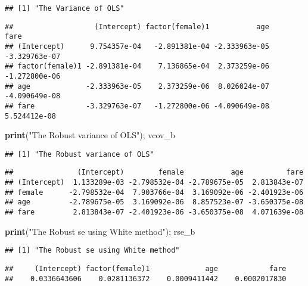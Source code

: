 \documentclass[
  12pt,
]{article}
\newenvironment{Shaded}{\begin{snugshade}}{\end{snugshade}}
\newcommand{\KeywordTok}[1]{\textcolor[rgb]{0.13,0.29,0.53}{\textbf{#1}}}
\newcommand{\NormalTok}[1]{#1}
\newcommand{\StringTok}[1]{\textcolor[rgb]{0.31,0.60,0.02}{#1}}
\begin{document}
\begin{verbatim}
## [1] "The Variance of OLS"
\end{verbatim}

\begin{verbatim}
##                   (Intercept) factor(female)1           age          fare
## (Intercept)      9.754357e-04   -2.891381e-04 -2.333963e-05 -3.329763e-07
## factor(female)1 -2.891381e-04    7.136865e-04  2.373259e-06 -1.272800e-06
## age             -2.333963e-05    2.373259e-06  8.026024e-07 -4.090649e-08
## fare            -3.329763e-07   -1.272800e-06 -4.090649e-08  5.524412e-08
\end{verbatim}

\begin{Shaded}
\begin{Highlighting}[]
\KeywordTok{print}\NormalTok{(}\StringTok{"The Robust variance of OLS"}\NormalTok{); vcov\_b}
\end{Highlighting}
\end{Shaded}

\begin{verbatim}
## [1] "The Robust variance of OLS"
\end{verbatim}

\begin{verbatim}
##               (Intercept)        female           age          fare
## (Intercept)  1.133289e-03 -2.798532e-04 -2.789675e-05  2.813843e-07
## female      -2.798532e-04  7.903766e-04  3.169092e-06 -2.401923e-06
## age         -2.789675e-05  3.169092e-06  8.857523e-07 -3.650375e-08
## fare         2.813843e-07 -2.401923e-06 -3.650375e-08  4.071639e-08
\end{verbatim}

\begin{Shaded}
\begin{Highlighting}[]
\KeywordTok{print}\NormalTok{(}\StringTok{"The Robust se using White method"}\NormalTok{); rse\_b}
\end{Highlighting}
\end{Shaded}

\begin{verbatim}
## [1] "The Robust se using White method"
\end{verbatim}

\begin{verbatim}
##     (Intercept) factor(female)1             age            fare 
##    0.0336643606    0.0281136372    0.0009411442    0.0002017830
\end{verbatim}
\end{document}
